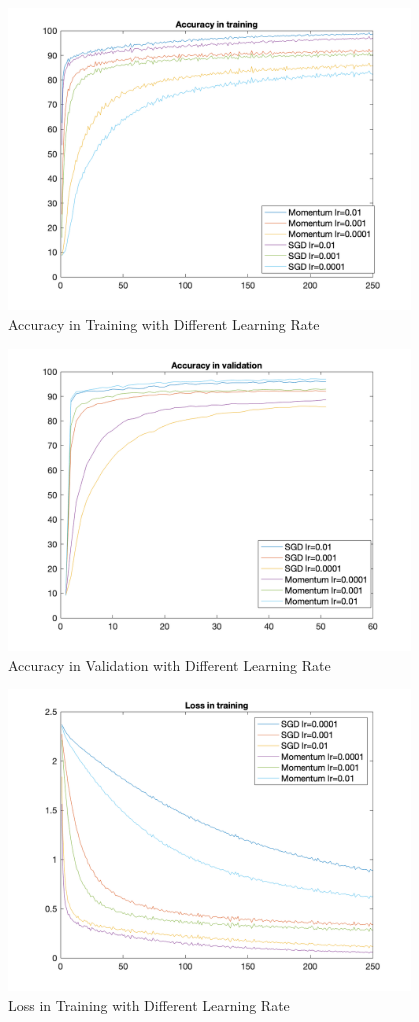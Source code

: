 \documentclass{article}
\begin{document}
\begin{figure}[!h]
  \centering
  \includegraphics[height=8cm]{plots/at_lr.png}
  \caption{Accuracy in Training with Different Learning Rate}
\end{figure}
\begin{figure}[!h]
  \centering
  \includegraphics[height=8cm]{plots/av_lr.png}
  \caption{Accuracy in Validation with Different Learning Rate}
\end{figure} 
\begin{figure}[!h]
  \centering
  \includegraphics[height=8cm]{plots/lt_lr.png}
  \caption{Loss in Training with Different Learning Rate}
\end{figure}
\end{document}
